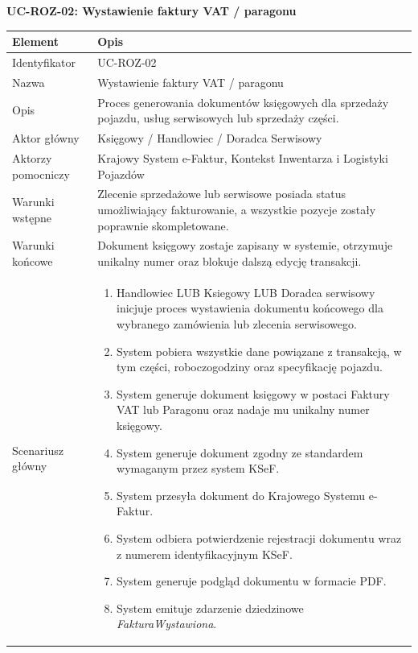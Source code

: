 \textbf{UC-ROZ-02: Wystawienie faktury VAT / paragonu}

\begin{longtable}{|p{4cm}|p{11cm}|}
\hline
\textbf{Element} & \textbf{Opis} \\
\hline

Identyfikator & UC-ROZ-02 \\
\hline

Nazwa & Wystawienie faktury VAT / paragonu \\
\hline

Opis &
Proces generowania dokumentów księgowych dla sprzedaży pojazdu, usług serwisowych lub sprzedaży części. \\
\hline

Aktor główny & Księgowy / Handlowiec / Doradca Serwisowy \\
\hline

Aktorzy pomocniczy & Krajowy System e-Faktur, Kontekst Inwentarza i Logistyki Pojazdów \\
\hline

Warunki wstępne &
Zlecenie sprzedażowe lub serwisowe posiada status umożliwiający fakturowanie, a wszystkie pozycje zostały poprawnie skompletowane. \\
\hline

Warunki końcowe &
Dokument księgowy zostaje zapisany w systemie, otrzymuje unikalny numer oraz blokuje dalszą edycję transakcji. \\
\hline

Scenariusz główny &
\begin{enumerate}
\item Handlowiec LUB Ksiegowy LUB Doradca serwisowy inicjuje proces wystawienia dokumentu końcowego dla wybranego zamówienia lub zlecenia serwisowego.
\item System pobiera wszystkie dane powiązane z transakcją, w tym części, roboczogodziny oraz specyfikację pojazdu.
\item System generuje dokument księgowy w postaci Faktury VAT lub Paragonu oraz nadaje mu unikalny numer księgowy.
\item System generuje dokument zgodny ze standardem wymaganym przez system KSeF.
\item System przesyła dokument do Krajowego Systemu e-Faktur.
\item System odbiera potwierdzenie rejestracji dokumentu wraz z numerem identyfikacyjnym KSeF.
\item System generuje podgląd dokumentu w formacie PDF.
\item System emituje zdarzenie dziedzinowe \textit{FakturaWystawiona}.
\end{enumerate}
\\
\hline


\end{longtable}
